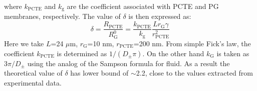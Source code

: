 where $k_{\mathrm{PCTE}}$ and $k_{\mathrm{g}}$ are the coefficient
associated with PCTE and PG membranes, respectively. The value of
$\delta$ is then expressed as:
\begin{equation}
  \label{eq:np-delta-resistance}
  \delta
  = \frac{R_{\mathrm{PCTE}}}{R_{\mathrm{G}}^{0}}
  = {\displaystyle
    \frac{k_{\mathrm{PCTE}}}{k_{\mathrm{g}}}
    \frac{L r_{\mathrm{G}} \gamma}
        {r_{\mathrm{PCTE}}^{2}}}
\end{equation}
Here we take $L$=24 $\mu$m, $r_{\mathrm{G}}$=10 nm,
$r_{\mathrm{PCTE}}$=200 nm. From simple Fick's law, the coefficient
$k_{\mathrm{PCTE}}$ is determined as $1/(D_{\mathrm{\pm}} \pi)$. On
the other hand $k_{\mathrm{G}}$ is taken as $3 \pi / D_{\mathrm{\pm}}$
using the analog of the Sampson formula for
fluid\cite{Roscoe_1949_sampson_formula}. As a result the theoretical
value of $\delta$ has lower bound of $\sim$2.2, close to the values
extracted from experimental data.

  





